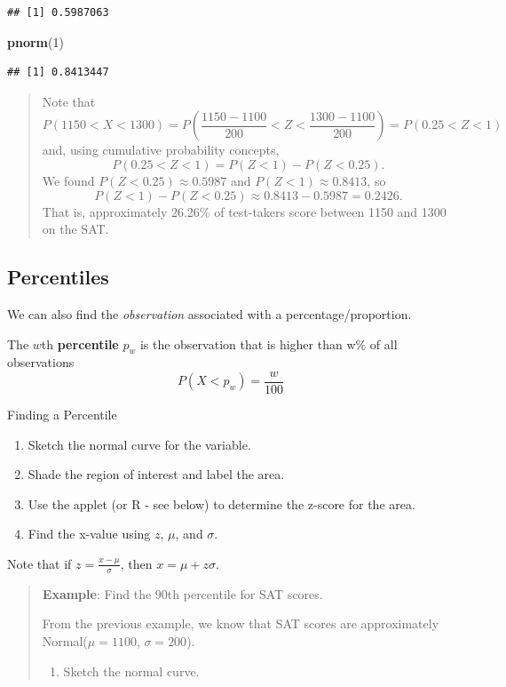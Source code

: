 \documentclass[
]{book}
\newenvironment{Shaded}{\begin{snugshade}}{\end{snugshade}}
\newcommand{\DecValTok}[1]{\textcolor[rgb]{0.00,0.00,0.81}{#1}}
\newcommand{\FunctionTok}[1]{\textcolor[rgb]{0.13,0.29,0.53}{\textbf{#1}}}
\newcommand{\NormalTok}[1]{#1}
\providecommand{\tightlist}{%
  \setlength{\itemsep}{0pt}\setlength{\parskip}{0pt}}
\begin{document}
\begin{verbatim}
## [1] 0.5987063
\end{verbatim}

\begin{Shaded}
\begin{Highlighting}[]
\FunctionTok{pnorm}\NormalTok{(}\DecValTok{1}\NormalTok{)}
\end{Highlighting}
\end{Shaded}

\begin{verbatim}
## [1] 0.8413447
\end{verbatim}

\begin{quote}
Note that \[P(1150 < X < 1300) = P\left(\frac{1150-1100}{200} < Z < \frac{1300-1100}{200}\right) = P(0.25 < Z < 1)\] and, using cumulative probability concepts, \[P(0.25 < Z < 1) = P(Z < 1) - P(Z < 0.25).\] We found \(P(Z < 0.25) \approx 0.5987\) and \(P(Z < 1) \approx 0.8413\), so \[P(Z < 1) - P(Z < 0.25) \approx 0.8413 - 0.5987 = 0.2426.\] That is, approximately 26.26\% of test-takers score between 1150 and 1300 on the SAT.
\end{quote}

\subsection{Percentiles}\label{percentiles}

We can also find the \emph{observation} associated with a percentage/proportion.

The \(w\)th \textbf{percentile} \(p_w\) is the observation that is higher than w\% of all observations \[P(X < p_w) = \frac{w}{100}\]

Finding a Percentile

\begin{enumerate}
\def\labelenumi{\arabic{enumi}.}
\tightlist
\item
  Sketch the normal curve for the variable.
\item
  Shade the region of interest and label the area.
\item
  Use the applet (or R - see below) to determine the z-score for the area.
\item
  Find the x-value using \(z\), \(\mu\), and \(\sigma\).
\end{enumerate}

Note that if \(z = \frac{x-\mu}{\sigma}\), then \(x = \mu + z\sigma\).

\begin{quote}
\textbf{Example}: Find the 90th percentile for SAT scores.

From the previous example, we know that SAT scores are approximately Normal(\(\mu=1100\), \(\sigma=200\)).

\begin{enumerate}
\def\labelenumi{\arabic{enumi}.}
\tightlist
\item
  Sketch the normal curve.
\end{enumerate}
\end{quote}
\end{document}
